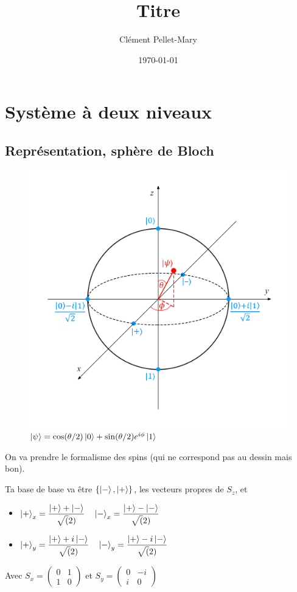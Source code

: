 \documentclass[a4paper]{report}
\title{Titre}
\author{Clément Pellet-Mary}
\date\today
\begin{document}
\chapter{Système à deux niveaux}
  \section{Représentation, sphère de Bloch}
  \begin{figure}[h]
  \centering
  \includegraphics[width=.8\textwidth]{BlochSphere}
  \caption{$\ket{\psi}=\cos (\theta/2)\ket{0}+\sin (\theta/2)e^{i \phi} \ket{1}$}
  \end{figure}
  
  On va prendre le formalisme des spins (qui ne correspond pas au dessin mais bon). 
  
  Ta base de base va être $\{\ket{-},\ket{+}\}$, les vecteurs propres de $S_z$, et
  \begin{itemize}
  \item $\ket{+}_x=\dfrac{\ket{+}+\ket{-}}{\sqrt(2)} \quad \ket{-}_x=\dfrac{\ket{+}-\ket{-}}{\sqrt(2)}$
  \item $\ket{+}_y=\dfrac{\ket{+}+i\ket{-}}{\sqrt(2)} \quad \ket{-}_y=\dfrac{\ket{+}-i\ket{-}}{\sqrt(2)}$
  \end{itemize}
  
  
  Avec $S_x= \begin{pmatrix} 0 & 1 \\ 1 & 0  \end{pmatrix}$ et $S_y= \begin{pmatrix} 0 & -i \\ i & 0  \end{pmatrix}$
  
\end{document}
